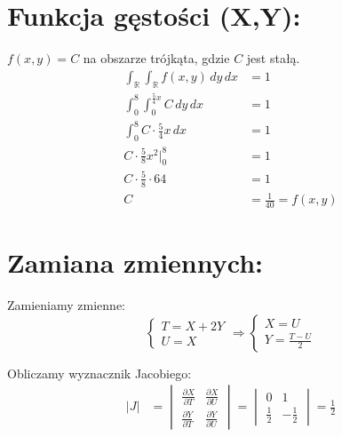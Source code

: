 \documentclass[12pt]{article}
\begin{document}
\vspace{1.5cm}

\section*{Funkcja gęstości (X,Y):}

$f(x,y) = C$ na obszarze trójkąta, gdzie $C$ jest stałą. \\

\begin{align*}
    \int_\mathbb{R}  \int_\mathbb{R}  f(x, y) \, dy \, dx &= 1 \\
    \int_0^8 \int_0^{\frac{5}{4}x} C \, dy \, dx &= 1 \\
    \int_0^8 C \cdot \frac{5}{4}x \, dx &= 1 \\
    C \cdot \frac{5}{8}x^2 \bigg|_0^8 &= 1 \\
    C \cdot \frac{5}{8} \cdot 64 &= 1 \\
    C &= \frac{1}{40} = f(x,y)
\end{align*}

\section*{Zamiana zmiennych:}
Zamieniamy zmienne: \\
\begin{equation*}
    \begin{cases}
        T = X + 2Y \\
        U = X
    \end{cases}
    \Rightarrow 
    \begin{cases}
        X = U \\
        Y = \frac{T - U}{2}
    \end{cases}
\end{equation*}

Obliczamy wyznacznik Jacobiego: \\
\begin{align*}
    |J| &= \begin{vmatrix}
        \frac{\partial X}{\partial T} & \frac{\partial X}{\partial U} \\
        \frac{\partial Y}{\partial T} & \frac{\partial Y}{\partial U}
    \end{vmatrix} = 
    \begin{vmatrix}
        0 & 1 \\
        \frac{1}{2} & -\frac{1}{2}
    \end{vmatrix} = \frac{1}{2}
\end{align*}
\end{document}

